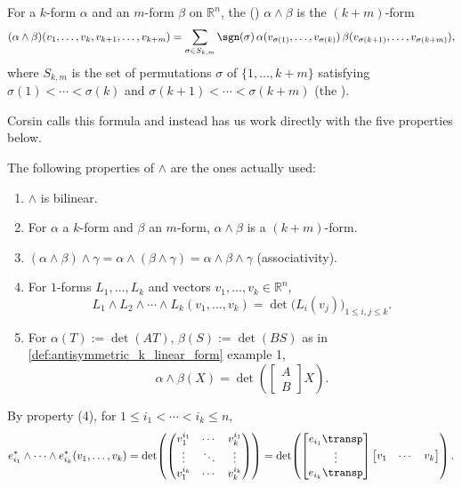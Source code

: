 \begin{definition}
\label{def:wedge_product}
For a $k$-form $\alpha$ and an $m$-form $\beta$ on $\mathbb{R}^n$, the 
() $\alpha \wedge \beta$ is the $(k+m)$-form
\[
(\alpha\wedge\beta)(v_1,\ldots,v_k,v_{k+1},\ldots,v_{k+m})
  = \sum_{\sigma \in S_{k,m}} \sgn(\sigma)\,\alpha(v_{\sigma(1)},\ldots,v_{\sigma(k)})\,
    \beta(v_{\sigma(k+1)},\ldots,v_{\sigma(k+m)}),
\]
where $S_{k,m}$ is the set of permutations $\sigma$ of $\{1,\ldots,k+m\}$ satisfying
$\sigma(1) < \cdots < \sigma(k)$ and $\sigma(k+1) < \cdots < \sigma(k+m)$ (the
).
\end{definition}

\begin{ainote}
Corsin calls this formula  and instead has us work
directly with the five properties below.
\end{ainote}

The following properties of $\wedge$ are the ones actually used:
\begin{enumerate}[label=\textbf{(\arabic*)}]
  \item $\wedge$ is bilinear.
  \item For $\alpha$ a $k$-form and $\beta$ an $m$-form, $\alpha\wedge\beta$ is a $(k+m)$-form.
  \item $(\alpha\wedge\beta)\wedge\gamma = \alpha\wedge(\beta\wedge\gamma) = \alpha\wedge\beta
  \wedge\gamma$ (associativity).
  \item For $1$-forms $L_1,\ldots,L_k$ and vectors $v_1,\ldots,v_k \in \mathbb{R}^n$,
  \[L_1\wedge L_2\wedge\cdots\wedge L_k(v_1,\ldots,v_k) = \det\big(L_i(v_j)\big)_{1\leq i,j
  \leq k}.\]
  \item For $\alpha(T) := \det(AT)$, $\beta(S) := \det(BS)$ as in \cref{def:antisymmetric_k_linear_form}
  example 1,
  \[\alpha\wedge\beta(X) = \det\!\left(\begin{bmatrix} A \\ B \end{bmatrix} X\right).\]
\end{enumerate}

\begin{example}
By property (4), for $1 \leq i_1 < \cdots < i_k \leq n$,
\[
e_{i_1}^*\wedge\cdots\wedge e_{i_k}^*(v_1,\ldots,v_k) = \det\!\left(
  \begin{pmatrix} v_1^{i_1} & \cdots & v_k^{i_1} \\ \vdots & \ddots & \vdots \\ v_1^{i_k} &
  \cdots & v_k^{i_k} \end{pmatrix}\right)
  = \det\!\left(\begin{bmatrix} e_{i_1}\transp \\ \vdots \\ e_{i_k}\transp \end{bmatrix}
  \begin{bmatrix} v_1 & \cdots & v_k \end{bmatrix}\right).
\]
\end{example}


